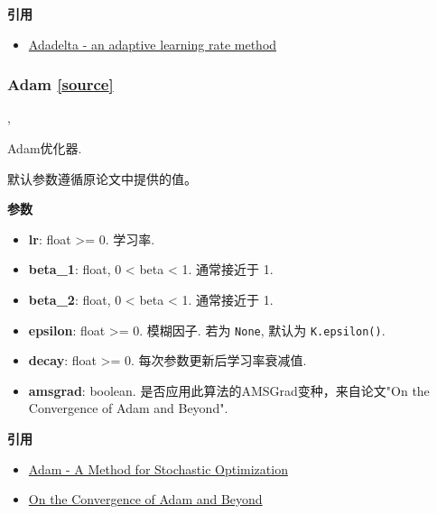 \textbf{引用}

\begin{itemize}
\tightlist
\item
  \href{http://arxiv.org/abs/1212.5701}{Adadelta - an adaptive learning
  rate method}
\end{itemize}




\subsubsection{Adam {\href{https://github.com/keras-team/keras/blob/master/keras/optimizers.py\#L397}{{[}source{]}}}}

\begin{Shaded}
\begin{Highlighting}[]
\OperatorTok{=}\OperatorTok{=}\OperatorTok{=}\OperatorTok{=}, \\
\hspace{4cm}\OperatorTok{=}\OperatorTok{=}\NormalTok{)}
\end{Highlighting}
\end{Shaded}

Adam优化器.

默认参数遵循原论文中提供的值。

\textbf{参数}

\begin{itemize}
\tightlist
\item
  \textbf{lr}: float \textgreater{}= 0. 学习率.
\item
  \textbf{beta\_1}: float, 0 \textless{} beta \textless{} 1. 通常接近于
  1.
\item
  \textbf{beta\_2}: float, 0 \textless{} beta \textless{} 1. 通常接近于
  1.
\item
  \textbf{epsilon}: float \textgreater{}= 0. 模糊因子. 若为
  \texttt{None}, 默认为 \texttt{K.epsilon()}.
\item
  \textbf{decay}: float \textgreater{}= 0. 每次参数更新后学习率衰减值.
\item
  \textbf{amsgrad}: boolean. 是否应用此算法的AMSGrad变种，来自论文"On
  the Convergence of Adam and Beyond".
\end{itemize}

\textbf{引用}

\begin{itemize}
\tightlist
\item
  \href{http://arxiv.org/abs/1412.6980v8}{Adam - A Method for Stochastic
  Optimization}
\item
  \href{https://openreview.net/forum?id=ryQu7f-RZ}{On the Convergence of
  Adam and Beyond}
\end{itemize}




